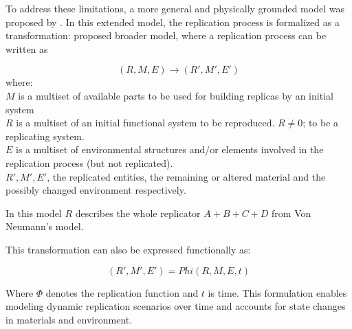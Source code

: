 To address these limitations, a more general and physically grounded model was proposed by \citeauthor{Lee2007Robotic} \cite{Lee2007Robotic}. In this extended model, the replication process is formalized as a transformation:
\citeauthor{Lee2007Robotic} proposed broader model, where a replication process can
be written as

\begin{equation}
    \label{eq:1}
    (R, M, E) \rightarrow (R' , M' , E' ) 
\end{equation}
where: \\
$M$ is a multiset of available parts to be used for building replicas by an initial system \\
$R$ is a multiset of an initial functional system to be reproduced. $R \neq 0$; to be a replicating system. \\ 
$E$ is a multiset of environmental structures and/or elements involved in the replication process (but not 
replicated). \\
$R', M', E'$, the replicated entities, the remaining or altered material and the possibly changed environment respectively.

In this model $R$ describes the whole replicator $ A+B+C+D $  from Von Neumann's model.

This transformation can also be expressed functionally as:




\begin{equation}
    \label{eq:2}
    (R' , M' , E' ) = Phi(R, M, E, t) 
\end{equation}

Where $\Phi$ denotes the replication function and $t$ is time. 
This formulation enables modeling dynamic replication scenarios over 
time and accounts for state changes in materials and environment.

